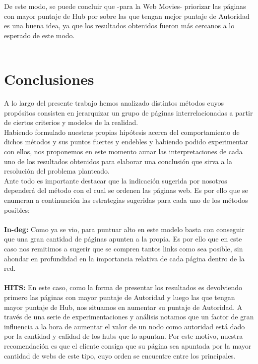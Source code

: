 \documentclass[a4paper]{article}
\begin{document}
\indent De este modo, se puede concluir que -para la Web Movies- priorizar las p\'aginas con mayor puntaje de Hub por sobre las que tengan mejor puntaje de Autoridad es una buena idea, ya que los resultados obtenidos fueron m\'as cercanos a lo esperado de este modo.\\
\\
\newpage
\section{Conclusiones}
A lo largo del presente trabajo hemos analizado distintos métodos cuyos propósitos consisten en jerarquizar un grupo de páginas interrelacionadas a partir de ciertos criterios y modelos de la realidad. \\
\indent Habiendo formulado nuestras propias hipótesis acerca del comportamiento de dichos métodos y sus puntos fuertes y endebles y habiendo podido experimentar con ellos, nos proponemos en este momento aunar las interpretaciones de cada uno de los resultados obtenidos para elaborar una conclusión que sirva a la resolución del problema planteado.\\
\indent Ante todo es importante destacar que la indicación sugerida por nosotros dependerá del método con el cual se ordenen las páginas web. Es por ello que se enumeran a continuación las estrategias sugeridas para cada uno de los métodos posibles:\\
\\
\indent \textbf{In-deg:} Como ya se vio, para puntuar alto en este modelo basta con conseguir que una gran cantidad de páginas apunten a la propia. Es por ello que en este caso nos remitimos a sugerir que se compren tantos links como sea posible, sin ahondar en profundidad en la importancia relativa de cada página dentro de la red.\\
\\
\indent \textbf{HITS:} En este caso, como la forma de presentar los resultados es devolviendo primero las p\'aginas con mayor puntaje de Autoridad y luego las que tengan mayor puntaje de Hub, nos situamos en aumentar su puntaje de Autoridad. A través de una serie de experimentaciones y análisis notamos que un factor de gran influencia a la hora de aumentar el valor de un nodo como autoridad está dado por la cantidad y calidad de los hubs que lo apuntan. Por este motivo, nuestra recomendación es que el cliente consiga que su página sea apuntada por la mayor cantidad de webs de este tipo, cuyo orden se encuentre entre los principales.\\
\end{document}
